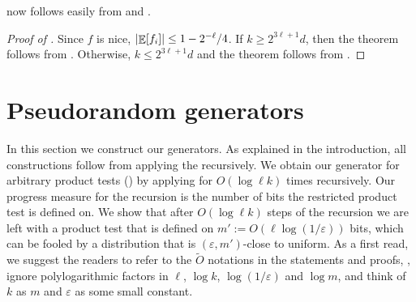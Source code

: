 \documentclass{toc}
\def\eps{\varepsilon}
\def\Blocklength{\ell}
\DeclarePairedDelimiter{\abs}{\lvert}{\rvert}
\DeclareMathOperator*{\E}{\mathbb{E}}                 %
\begin{document}
	 now follows easily from  and .

  \begin{proof}[Proof of {}]
		Since $f$ is nice, $\abs{\E[f_i]} \le 1 - 2^{-\Blocklength}/4$.
    If $k \ge 2^{3\Blocklength+1} d$, then the theorem follows from .
    Otherwise, $k \le 2^{3\Blocklength+1} d$ and the theorem follows from .
  \end{proof}


  \section{Pseudorandom generators} \label{sec:prg}
	In this section we construct our generators.
  As explained in the introduction, all constructions follow from applying the  recursively.
  We obtain our generator for arbitrary product tests () by applying  for $O(\log \Blocklength k)$ times recursively.
  Our progress measure for the recursion is the number of bits the restricted product test is defined on.
  We show that after $O(\log \Blocklength k)$ steps of the recursion we are left with a product test that is defined on $m' := O(\Blocklength \log(1/\eps))$ bits, which can be fooled by a distribution that is $(\eps, m')$-close to uniform.
  As a first read, we suggest the readers to refer to the $\tilde O$ notations in the statements and proofs, \ie, ignore polylogarithmic factors in $\Blocklength$, $\log k$, $\log(1/\eps)$ and $\log m$, and think of $k$ as $m$ and $\eps$ as some small constant.
\end{document}
